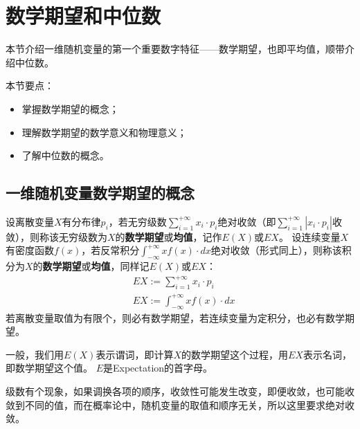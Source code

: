 \section{数学期望和中位数}

本节介绍一维随机变量的第一个重要数字特征——数学期望，也即平均值，顺带介绍中位数。

本节要点：
\begin{itemize}
    \item 掌握数学期望的概念；
    \item 理解数学期望的数学意义和物理意义；
    \item 了解中位数的概念。
\end{itemize}

\subsection{一维随机变量数学期望的概念}

\begin{definition}[一维随机变量的数学期望]
设离散变量$X$有分布律$p_i$，若无穷级数$\sum_{i=1}^{+\infty}{x_i\cdot p_i}$绝对收敛（即$\sum_{i=1}^{+\infty}{\left| x_i\cdot p_i \right|}$收敛），则称该无穷级数为$X$的{\bf 数学期望}或{\bf 均值}，记作$E\left( X \right) $或$EX$。
设连续变量$X$有密度函数$f\left( x \right) $，若反常积分$\int_{-\infty}^{+\infty}{xf\left( x \right) \cdot dx}$绝对收敛（形式同上），则称该积分为$X$的{\bf 数学期望}或{\bf 均值}，同样记$E\left( X \right) $或$EX$：
\begin{align*}
&EX:=\sum_{i=1}^{+\infty}{x_i\cdot p_i} \\
&EX:=\int_{-\infty}^{+\infty}{xf\left( x \right) \cdot dx}
\end{align*}
若离散变量取值为有限个，则必有数学期望，若连续变量为定积分，也必有数学期望。
\end{definition}

一般，我们用$E\left( X \right) $表示谓词，即计算$X$的数学期望这个过程，用$EX$表示名词，即数学期望这个值。
$E$是Expectation的首字母。

\begin{tcolorbox}
级数有个现象，如果调换各项的顺序，收敛性可能发生改变，即便收敛，也可能收敛到不同的值，而在概率论中，随机变量的取值和顺序无关，所以这里要求绝对收敛。
\end{tcolorbox}

